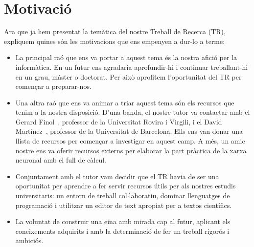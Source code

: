 \section{Motivació}
\vspace{-0.4truecm}
Ara que ja hem presentat la temàtica del nostre Treball de Recerca (TR), expliquem quines són les motivacions que ens empenyen a dur-lo a terme:
\vspace{-0.4truecm}
\begin{itemize}
\item La principal raó que ens va portar a aquest tema és la nostra afició per la informàtica. En un futur ens agradaria aprofundir-hi i continuar treballant-hi en un grau, màster o doctorat. Per això aprofitem l’oportunitat del TR per començar a preparar-nos.

\item Una altra raó que ens va animar a triar aquest tema són els recursos que tenim a la nostra disposició. D'una banda, el nostre tutor va contactar amb el Gerard Finol~\cite{gerard}, professor de la Universitat Rovira i Virgili, i el David Martínez~\cite{david}, professor de la Universitat de Barcelona. Ells ens van donar una llista de recursos per començar a investigar en aquest camp. A més, un amic nostre ens va oferir recursos externs per elaborar la part pràctica de la xarxa neuronal amb el full de càlcul.

\item Conjuntament amb el tutor vam decidir que el TR havia de ser una oportunitat per aprendre a fer servir recursos útils per als nostres estudis universitaris: un entorn de treball col$\cdot$laboratiu, dominar llenguatges de programació i utilitzar un editor de text apropiat per a textos científics.

\item La voluntat de construir una eina amb mirada cap al futur, aplicant els coneixements adquirits i amb la determinació de fer un treball rigorós i ambiciós.
\end{itemize}

\vspace{-1truecm}
